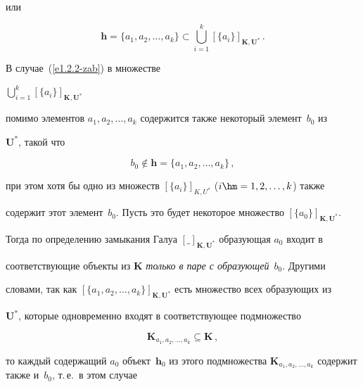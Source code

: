 или

\begin{equation}

\mathbf{h} = \{a_1,a_2, \ldots , a_k\} \subset \mathop{\bigcup}\limits_{i=1}^k 

[\{a_i\}]_{\mathbf{K},\mathbf{U}^*}\,.\label{e1.2.2-zab}

\end{equation}

В случае~(\ref{e1.2.2-zab}) в множестве 

$\mathop{\bigcup}\limits_{i=1}^k [\{a_i\}]_{\mathbf{K},\mathbf{U}^*}$

помимо элементов $a_1, a_2, \ldots , a_k$ содержится также некоторый элемент~$b_0$ из 

$\mathbf{U}^*$, такой что

\begin{equation}

b_0 \not\in  \mathbf{h} = \{a_1, a_2, \ldots , a_k\}\,,

\label{e1.3-zab}

\end{equation}

при этом хотя бы одно из множеств $[\{a_i\}]_{K,U^*}$ ($i \hm= 1, 2, \ldots , k$) также 

содержит этот элемент~$b_0$. Пусть это будет некоторое множество $[\{a_0\}]_{\mathbf{K},\mathbf{U}^*}$. 

Тогда по определению замыкания Галуа $[\_]_{\mathbf{K},\mathbf{U}^*}$ образующая $a_0$ входит в 

соответствующие объекты из $\mathbf{K}$ \textit{только в паре с образующей}~$b_0$. Другими 

словами, так как $[\{a_1, a_2, \ldots , a_k\}]_{\mathbf{K},\mathbf{U}^*}$ есть множество всех образующих из 

$\mathbf{U}^*$, которые одновременно входят в соответствующее подмножество 

\begin{equation}

\mathbf{K}_{a_1, a_2, \ldots  , a_k} \subseteq \mathbf{K}\,,

\label{e1.4-zab}

\end{equation}

то каждый содержащий $a_0$ объект~$\mathbf{h}_0$ из этого подмножества $\mathbf{K}_{a_1, a_2, 

\ldots, a_k}$ содержит также и~$b_0$, т.\,е.\ в этом случае

